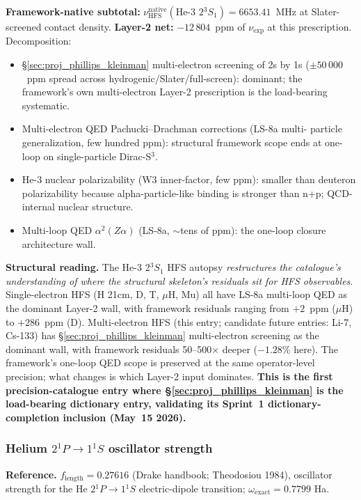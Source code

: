 \documentclass[11pt]{article}
\begin{document}
\textbf{Framework-native subtotal:} $\nu_\text{HFS}^\text{native}
(\text{He-3 } 2{}^3\!S_1) = 6653.41$~MHz at Slater-screened contact
density. \textbf{Layer-2 net:} $-12\,804$~ppm of $\nu_\text{exp}$ at
this prescription. Decomposition:
\begin{itemize}\setlength\itemsep{0pt}
\item \S\ref{sec:proj_phillips_kleinman} multi-electron screening of
2s by 1s ($\pm 50\,000$~ppm spread across hydrogenic/Slater/full-screen):
dominant; the framework's own multi-electron Layer-2 prescription is
the load-bearing systematic.
\item Multi-electron QED Pachucki--Drachman corrections (LS-8a multi-
particle generalization, few hundred ppm): structural framework scope
ends at one-loop on single-particle Dirac-S$^3$.
\item He-3 nuclear polarizability (W3 inner-factor, few ppm): smaller
than deuteron polarizability because alpha-particle-like binding is
stronger than n+p; QCD-internal nuclear structure.
\item Multi-loop QED $\alpha^2(Z\alpha)$ (LS-8a, $\sim$tens of ppm):
the one-loop closure architecture wall.
\end{itemize}

\textbf{Structural reading.} The He-3 2$^3\!S_1$ HFS autopsy
\emph{restructures the catalogue's understanding of where the structural
skeleton's residuals sit for HFS observables}. Single-electron HFS
(H 21cm, D, T, $\mu$H, Mu) all have LS-8a multi-loop QED as the
dominant Layer-2 wall, with framework residuals ranging from
$+2$~ppm ($\mu$H) to $+286$~ppm (D). Multi-electron HFS (this entry;
candidate future entries: Li-7, Cs-133) has
\S\ref{sec:proj_phillips_kleinman} multi-electron screening as the
dominant wall, with framework residuals 50--500$\times$ deeper
($-1.28\%$ here). The framework's one-loop QED scope is preserved at
the same operator-level precision; what changes is which Layer-2 input
dominates. \textbf{This is the first precision-catalogue entry where
\S\ref{sec:proj_phillips_kleinman} is the load-bearing dictionary
entry, validating its Sprint~1 dictionary-completion inclusion
(May~15 2026).}

\subsubsection{Helium $2{}^1\!P \to 1{}^1\!S$ oscillator strength}
\label{sec:autopsy_he_oscillator}

\textbf{Reference.}  $f_\text{length} = 0.27616$ (Drake handbook;
Theodosiou 1984), oscillator strength for the He $2{}^1P \to 1{}^1S$
electric-dipole transition; $\omega_\text{exact} = 0.7799$ Ha.
\end{document}
